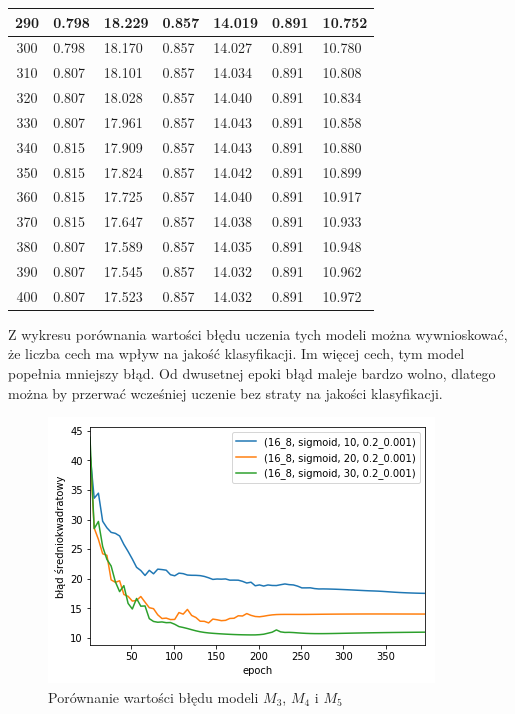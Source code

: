 \begin{longtable}{|c|l|l|l|l|l|l|}
        290 & 0.798 & 18.229 & 0.857 & 14.019 & 0.891 & 10.752 \\ \hline
        300 & 0.798 & 18.170 & 0.857 & 14.027 & 0.891 & 10.780 \\ \hline
        310 & 0.807 & 18.101 & 0.857 & 14.034 & 0.891 & 10.808 \\ \hline
        320 & 0.807 & 18.028 & 0.857 & 14.040 & 0.891 & 10.834 \\ \hline
        330 & 0.807 & 17.961 & 0.857 & 14.043 & 0.891 & 10.858 \\ \hline
        340 & 0.815 & 17.909 & 0.857 & 14.043 & 0.891 & 10.880 \\ \hline
        350 & 0.815 & 17.824 & 0.857 & 14.042 & 0.891 & 10.899 \\ \hline
        360 & 0.815 & 17.725 & 0.857 & 14.040 & 0.891 & 10.917 \\ \hline
        370 & 0.815 & 17.647 & 0.857 & 14.038 & 0.891 & 10.933 \\ \hline
        380 & 0.807 & 17.589 & 0.857 & 14.035 & 0.891 & 10.948 \\ \hline
        390 & 0.807 & 17.545 & 0.857 & 14.032 & 0.891 & 10.962 \\ \hline
        400 & 0.807 & 17.523 & 0.857 & 14.032 & 0.891 & 10.972 \\ \hline
    \end{longtable}

    Z wykresu porównania wartości błędu uczenia tych modeli można wywnioskować, że liczba cech ma wpływ na jakość klasyfikacji.
    Im więcej cech, tym model popełnia mniejszy błąd.
    Od dwusetnej epoki błąd maleje bardzo wolno, dlatego można by przerwać wcześniej uczenie bez straty na jakości klasyfikacji.

    \begin{figure}[htp]
        \centering
        \includegraphics[scale=0.8]{./img/feat-error.png}
        \caption{Porównanie wartości błędu modeli $M_3$, $M_4$ i $M_5$}
    \end{figure}

